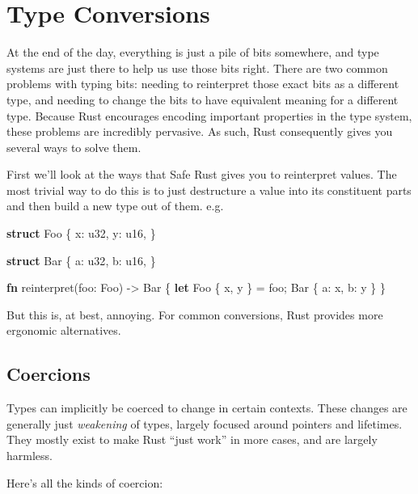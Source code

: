 \documentclass[a4paper,]{book}
\newenvironment{Shaded}{\begin{snugshade}}{\end{snugshade}}
\newcommand{\KeywordTok}[1]{\textcolor[rgb]{0.13,0.29,0.53}{\textbf{{#1}}}}
\newcommand{\DataTypeTok}[1]{\textcolor[rgb]{0.13,0.29,0.53}{{#1}}}
\newcommand{\NormalTok}[1]{{#1}}
\begin{document}
\chapter{Type Conversions}\label{sec--conversions}

At the end of the day, everything is just a pile of bits somewhere, and
type systems are just there to help us use those bits right. There are
two common problems with typing bits: needing to reinterpret those exact
bits as a different type, and needing to change the bits to have
equivalent meaning for a different type. Because Rust encourages
encoding important properties in the type system, these problems are
incredibly pervasive. As such, Rust consequently gives you several ways
to solve them.

First we'll look at the ways that Safe Rust gives you to reinterpret
values. The most trivial way to do this is to just destructure a value
into its constituent parts and then build a new type out of them. e.g.

\begin{Shaded}
\begin{Highlighting}[]
\KeywordTok{struct} \NormalTok{Foo \{}
    \NormalTok{x: }\DataTypeTok{u32}\NormalTok{,}
    \NormalTok{y: }\DataTypeTok{u16}\NormalTok{,}
\NormalTok{\}}

\KeywordTok{struct} \NormalTok{Bar \{}
    \NormalTok{a: }\DataTypeTok{u32}\NormalTok{,}
    \NormalTok{b: }\DataTypeTok{u16}\NormalTok{,}
\NormalTok{\}}

\KeywordTok{fn} \NormalTok{reinterpret(foo: Foo) -> Bar \{}
    \KeywordTok{let} \NormalTok{Foo \{ x, y \} = foo;}
    \NormalTok{Bar \{ a: x, b: y \}}
\NormalTok{\}}
\end{Highlighting}
\end{Shaded}

But this is, at best, annoying. For common conversions, Rust provides
more ergonomic alternatives.

\section{Coercions}\label{sec--coercions}

Types can implicitly be coerced to change in certain contexts. These
changes are generally just \emph{weakening} of types, largely focused
around pointers and lifetimes. They mostly exist to make Rust ``just
work'' in more cases, and are largely harmless.

Here's all the kinds of coercion:
\end{document}
